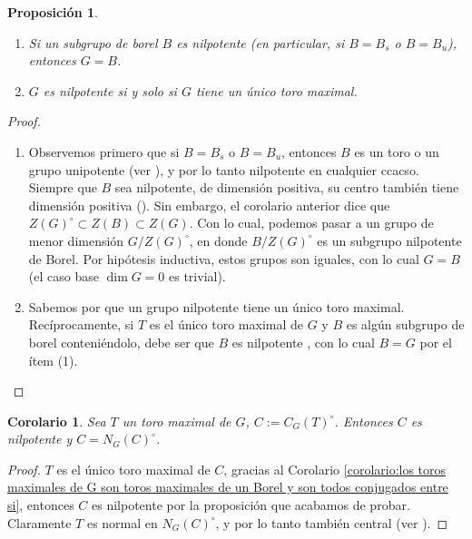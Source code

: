 \documentclass[spanish,10pt]{amsart}
\newtheorem{corollary}[theorem]{Corolario}
\newtheorem{proposition}[theorem]{Proposición}
\theoremstyle{definition}
\theoremstyle{remark}
\numberwithin{equation}{section}
\begin{document}
\begin{proposition}
\begin{enumerate}[(1)]
\item Si un subgrupo de borel $B$ es nilpotente (en particular, si $B = B_s$ o $B = B_u$), entonces $G = B$.
\item $G$ es nilpotente si y solo si $G$ tiene un único toro maximal.
\end{enumerate}
\end{proposition}
\begin{proof}
\begin{enumerate}[(1)]
\item Observemos primero que si $B = B_s$ o $B = B_u$, entonces $B$ es un toro o un grupo unipotente (ver \cite[Teorema 19.3]{humphreys2012linearAlgebraicGroups}), y por lo tanto nilpotente en cualquier ccacso. Siempre que $B$ sea nilpotente, de dimensión positiva, su centro también tiene dimensión positiva (\cite[Proposición 17.4 (a)]{humphreys2012linearAlgebraicGroups}). Sin embargo, el corolario anterior dice que $Z(G)^\circ \subset Z (B) \subset Z (G)$. Con lo cual, podemos pasar a un grupo de menor dimensión $G/Z(G)^{\circ}$, en donde $B / Z(G)^\circ$ es un subgrupo nilpotente de Borel. Por hipótesis inductiva, estos grupos son iguales, con lo cual $G = B$ (el caso base $\dim G = 0$ es trivial).
\item Sabemos por \cite[(19.2)]{humphreys2012linearAlgebraicGroups} que un grupo nilpotente tiene un único toro maximal. Recíprocamente, si $T$ es el único toro maximal de $G$ y $B$ es algún subgrupo de borel conteniéndolo, debe ser que $B$ es nilpotente \cite[(19.2)(19.3)]{humphreys2012linearAlgebraicGroups}, con lo cual $B = G$ por el ítem (1).
\end{enumerate}
\end{proof}

\begin{corollary}
Sea $T$ un toro maximal de $G$, $C := C_G (T)^\circ$. Entonces $C$ es nilpotente y $C = N_G (C)^\circ$.
\end{corollary}
\begin{proof}
$T$ es el único toro maximal de $C$, gracias al Corolario \ref{corolario:los toros maximales de G son toros maximales de un Borel y son todos conjugados entre si}, entonces $C$ es nilpotente por la proposición que acabamos de probar. Claramente $T$ es normal en $N_G (C)^\circ$, y por lo tanto también central (ver \cite[Corolario 16.3]{humphreys2012linearAlgebraicGroups}).
\end{proof}
\end{document}
